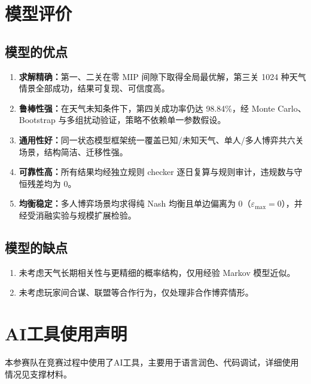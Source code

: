 \documentclass{cumcmthesis}
\numberwithin{equation}{section}
\numberwithin{figure}{section}
\numberwithin{table}{section}
\begin{document}
\section{模型评价}

\subsection{模型的优点}
\begin{enumerate}
    \item \textbf{求解精确：}第一、二关在零 MIP 间隙下取得全局最优解，第三关 1024 种天气情景全部成功，结果可复现、可信度高。
    \item \textbf{鲁棒性强：}在天气未知条件下，第四关成功率仍达 98.84\%，经 Monte Carlo、Bootstrap 与多组扰动验证，策略不依赖单一参数假设。
    \item \textbf{通用性好：}同一状态模型框架统一覆盖已知/未知天气、单人/多人博弈共六关场景，结构简洁、迁移性强。
    \item \textbf{可靠性高：}所有结果均经独立规则 checker 逐日复算与规则审计，违规数与守恒残差均为 0。
    \item \textbf{均衡稳定：}多人博弈场景均求得纯 Nash 均衡且单边偏离为 0（$\varepsilon_{\max}=0$），并经受消融实验与规模扩展检验。
\end{enumerate}

\subsection{模型的缺点}
\begin{enumerate}
    \item 未考虑天气长期相关性与更精细的概率结构，仅用经验 Markov 模型近似。
    \item 未考虑玩家间合谋、联盟等合作行为，仅处理非合作博弈情形。
\end{enumerate}

\section{AI工具使用声明}

本参赛队在竞赛过程中使用了AI工具，主要用于语言润色、代码调试，详细使用情况见支撑材料。
\end{document}
